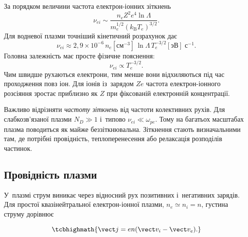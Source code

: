 За порядком величини частота електрон-іонних зіткнень
\begin{equation}\label{eq:nu-ei}
	\nu_{ei}\sim\frac{n_e Z^2e^4\ln\Lambda}{m_e^{1/2}(k_{\mathrm B}T_e)^{3/2}}.
\end{equation}
Для водневої плазми точніший кінетичний розрахунок дає
\begin{equation*}
	\nu_{ei}\approx2{,}9\times10^{-6}\,n_e[\mathrm{см}^{-3}]\,\ln\Lambda\,T_e^{-3/2}[\mathrm{эВ}]\;\mathrm{с}^{-1}.
\end{equation*}
Головна залежність має просте фізичне пояснення:
\begin{equation*}
	\nu_{ei}\propto T_e^{-3/2}.
\end{equation*}
Чим швидше рухаються електрони, тим менше вони відхиляються під час проходження повз іон.
Для іонів із~зарядом $Ze$ частота електрон-іонного розсіяння зростає приблизно як $Z$ при
фіксованій електронній концентрації.

Важливо відрізняти \emph{частоту зіткнень} від частоти колективних рухів. Для
слабкозв'язаної плазми $N_D\gg1$ і~типово $\nu_{ei}\ll\omega_{pe}$. Тому на багатьох
масштабах плазма поводиться як майже беззіткнювальна. Зіткнення стають визначальними там,
де потрібні провідність, теплоперенесення або релаксація розподілів частинок.



\subsection*{Провідність плазми}


У~плазмі струм виникає через відносний рух позитивних і~негативних зарядів. Для простої
квазінейтральної електрон-іонної плазми, $n_e\simeq n_i=n$, густина струму дорівнює

\begin{equation}\label{eq:plasma-current}
	\tcbhighmath{\vect j=en(\vect v_i-\vect v_e).}
\end{equation}

